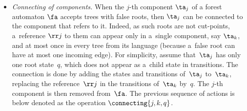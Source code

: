 \begin{itemize}
%

\item \emph{Connecting of components.}
When the $j$-th component $\ta_j$ of a forest automaton $\fa$ accepts trees with false roots, 
then $\ta_j$ can be connected to the component that refers to it. 
%
Indeed, as such roots are not cut-points, 
a~reference $\rr j$ to them can appear only in a~single component, say $\ta_k$, 
and at most once in every tree from its language (because a~false root
can have at most one incoming edge). 
%
For simplicity, assume that~$\ta_j$ has only one root state~$q$, which does
not appear as a~child state in transitions.
%
The connection is done by adding the states and transitions of~$\ta_j$ to~$\ta_k$,
replacing the reference~$\rr j$ in the transitions of~$\ta_k$ by~$q$.
%
The $j$-th component is then removed from~$\fa$.
%
The previous sequence of actions is below denoted as the operation $\connecting{j,k,q}$. 
%
%

\end{itemize}
